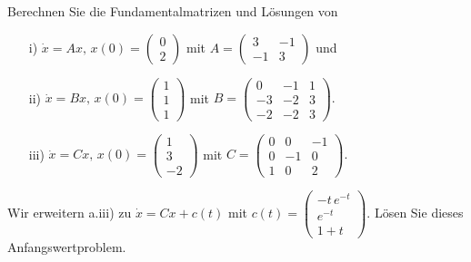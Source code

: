 \begin{Problem}
	\begin{parts}
		\item Berechnen Sie die Fundamentalmatrizen und Lösungen von
		\begin{enumerate}
			\item[i)] $\dot{x} = Ax, \, x(0) = \begin{pmatrix} 0 \\ 2 \end{pmatrix}$ mit 
			$
			A = \begin{pmatrix}
				3 & -1 \\
				-1 & 3
			\end{pmatrix}
			$
			und
			\item[ii)] $\dot{x} = Bx, \, x(0) = \begin{pmatrix} 1 \\ 1 \\ 1 \end{pmatrix}$ mit 
			$
			B = \begin{pmatrix}
				0 & -1 & 1 \\
				-3 & -2 & 3 \\
				-2 & -2 & 3
			\end{pmatrix}.
			$
			\item[iii)] $\dot{x} = Cx, \, x(0) = \begin{pmatrix} 1 \\ 3 \\ -2 \end{pmatrix}$ mit 
			$
			C = \begin{pmatrix}
				0 & 0 & -1 \\
				0 & -1 & 0 \\
				1 & 0 & 2
			\end{pmatrix}.
			$
		\end{enumerate}
		
		\item Wir erweitern a.iii) zu $\dot{x} = Cx + c(t)$ mit 
		$
		c(t) = \begin{pmatrix}
			-t \, e^{-t} \\
			e^{-t} \\
			1 + t
		\end{pmatrix}.
		$
		Lösen Sie dieses Anfangswertproblem.
	\end{parts}
\end{Problem}

